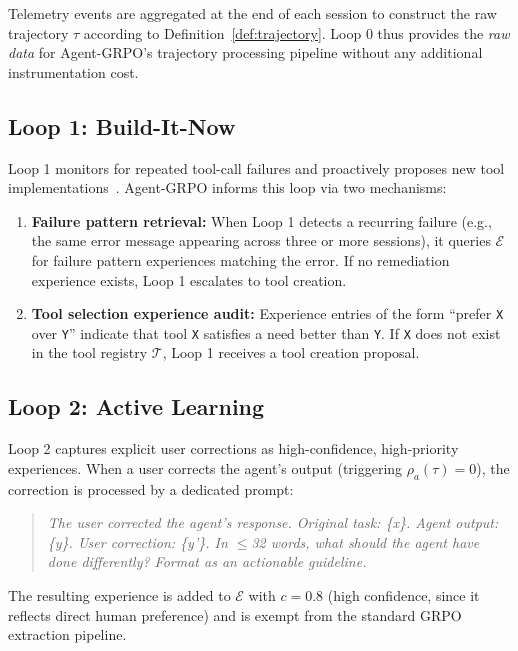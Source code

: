 \documentclass[11pt]{article}
\begin{document}
Telemetry events are aggregated at the end of each session to construct the
raw trajectory $\tau$ according to Definition~\ref{def:trajectory}. Loop 0
thus provides the \emph{raw data} for Agent-GRPO's trajectory processing
pipeline without any additional instrumentation cost.

\subsection{Loop 1: Build-It-Now}

Loop 1 monitors for repeated tool-call failures and proactively proposes
new tool implementations~\cite{wang2023voyager}. Agent-GRPO informs this loop
via two mechanisms:

\begin{enumerate}[leftmargin=1.5em]
    \item \textbf{Failure pattern retrieval:} When Loop 1 detects a recurring
          failure (e.g., the same error message appearing across three or more
          sessions), it queries $\mathcal{E}$ for failure pattern experiences
          matching the error. If no remediation experience exists, Loop 1
          escalates to tool creation.
    \item \textbf{Tool selection experience audit:} Experience entries of the
          form ``prefer \texttt{X} over \texttt{Y}'' indicate that tool \texttt{X}
          satisfies a need better than \texttt{Y}. If \texttt{X} does not exist
          in the tool registry $\mathcal{T}$, Loop 1 receives a tool creation
          proposal.
\end{enumerate}

\subsection{Loop 2: Active Learning}

Loop 2 captures explicit user corrections as high-confidence, high-priority
experiences. When a user corrects the agent's output (triggering
$\rho_a(\tau) = 0$), the correction is processed by a dedicated prompt:

\begin{quote}
\textit{The user corrected the agent's response. Original task: \{x\}. Agent
output: \{y\}. User correction: \{y'\}. In $\leq$32 words, what should the
agent have done differently? Format as an actionable guideline.}
\end{quote}

The resulting experience is added to $\mathcal{E}$ with $c = 0.8$ (high
confidence, since it reflects direct human preference) and is exempt from the
standard GRPO extraction pipeline.
\end{document}
